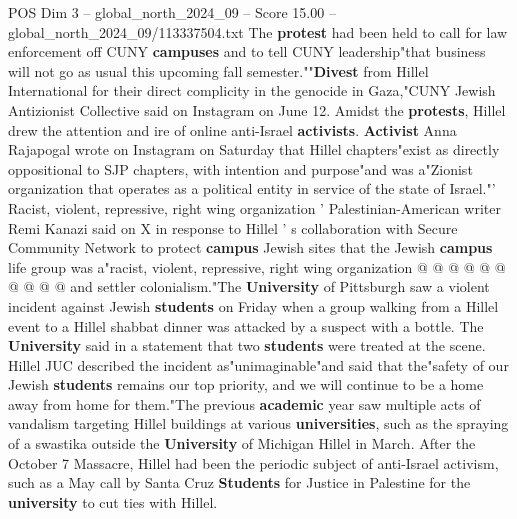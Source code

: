 \begin{textsample}{POS Dim 3 – global\_north\_2024\_09 – Score 15.00 – global\_north\_2024\_09/113337504.txt}
The \textbf{protest} had been held to call for law enforcement off CUNY \textbf{campuses} and to tell CUNY leadership"that business will not go as usual this upcoming fall semester.""\textbf{Divest} from Hillel International for their direct complicity in the genocide in Gaza,"CUNY Jewish Antizionist Collective said on Instagram on June 12.
Amidst the \textbf{protests}, Hillel drew the attention and ire of online anti-Israel \textbf{activists}. \textbf{Activist} Anna Rajapogal wrote on Instagram on Saturday that Hillel chapters"exist as directly oppositional to SJP chapters, with intention and purpose"and was a"Zionist organization that operates as a political entity in service of the state of Israel."' Racist, violent, repressive, right wing organization ' Palestinian-American writer Remi Kanazi said on X in response to Hillel ' s collaboration with Secure Community Network to protect \textbf{campus} Jewish sites that the Jewish \textbf{campus} life group was a"racist, violent, repressive, right wing organization @ @ @ @ @ @ @ @ @ @ and settler colonialism."The \textbf{University} of Pittsburgh saw a violent incident against Jewish \textbf{students} on Friday when a group walking from a Hillel event to a Hillel shabbat dinner was attacked by a suspect with a bottle.
The \textbf{University} said in a statement that two \textbf{students} were treated at the scene.
Hillel JUC described the incident as"unimaginable"and said that the"safety of our Jewish \textbf{students} remains our top priority, and we will continue to be a home away from home for them."The previous \textbf{academic} year saw multiple acts of vandalism targeting Hillel buildings at various \textbf{universities}, such as the spraying of a swastika outside the \textbf{University} of Michigan Hillel in March.
After the October 7 Massacre, Hillel had been the periodic subject of anti-Israel activism, such as a May call by Santa Cruz \textbf{Students} for Justice in Palestine for the \textbf{university} to cut ties with Hillel.

\end{textsample}
